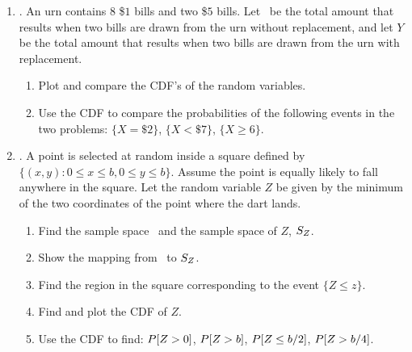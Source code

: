 


%

\usepackage{fullpage}
\usepackage{fancyhdr}

\usepackage{graphicx}

\pagestyle{fancy}

\addtolength{\headsep}{.5cm}




\renewcommand{\emph}[1]{{\it #1}}


\setlength{\headheight}{15pt}
\maketitle

\begin{enumerate}

	\item {}.
	An urn contains $8$ \$$1$ bills
	and two \$$5$ bills.
	Let \X\ be the total amount that results when two bills are drawn from the urn without replacement,
	and
	let $Y$ be the total amount that results when two bills are drawn from the urn with replacement.
	\begin{enumerate}
		\item Plot and compare the CDF's of the random variables.
		\item Use the CDF to compare the probabilities of the following events in the two problems:
		$\{X = \$2\}$,
		$\{X < \$7\}$,
		$\{X \geq 6\}$.
	\end{enumerate}


	\item {}.
	A point is selected at random inside a square defined by
	$\{(x, y): 0 \leq x \leq b, 0 \leq y \leq b\}$.
	Assume the point is equally likely to fall anywhere in the square.
	Let the random variable $Z$ be given by the minimum of the two coordinates of the point
	where the dart lands.
	\begin{enumerate}
		\item Find the sample space \sspace\
		and the sample space of $Z$, $S_{Z}$.
		\item Show the mapping from \sspace\ to $S_{Z}$.
		\item Find the region in the square corresponding to the event
		$\{Z \leq z\}$.
		\item Find and plot the CDF of $Z$.
		\item Use the CDF to find: $P[Z > 0]$, $P[Z > b]$, $P[Z \leq b/2]$, $P[Z > b/4]$.
	\end{enumerate}



\end{enumerate}
